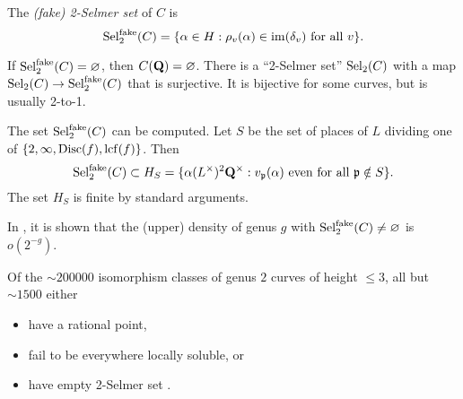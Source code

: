 \begin{defi}
The \emph{(fake) 2-Selmer set} of $C$ is 
\[
  \operatorname{Sel}_2^\mathrm{fake}(C) = \{\alpha\in H:\rho_v(\alpha)\in \operatorname{im}(\delta_v)\text{ for all }v\} .
\]
\end{defi}

If $\operatorname{Sel}_2^\mathrm{fake}(C)=\varnothing$, then $C(\mathbf{Q})=\varnothing$. 
There is a ``2-Selmer set'' $\operatorname{Sel}_2(C)$ with a map 
$\operatorname{Sel}_2(C) \to \operatorname{Sel}_2^\mathrm{fake}(C)$ that is surjective. It is 
bijective for some curves, but is usually 2-to-1. 

The set $\operatorname{Sel}_2^\mathrm{fake}(C)$ can be computed. Let $S$ be the set of 
places of $L$ dividing one of 
$\{2,\infty,\operatorname{Disc}(f),\operatorname{lcf}(f)\}$. Then 
\[
  \operatorname{Sel}_2^\mathrm{fake}(C)\subset H_S = \{\alpha (L^\times)^2\mathbf{Q}^\times:v_{\mathfrak{p}}(\alpha)\text{ even for all }\mathfrak{p}\notin S\} .
\]
The set $H_S$ is finite by standard arguments. 

In \cite{bg13}, it is shown that the (upper) density of genus $g$ 
with $\operatorname{Sel}_2^\mathrm{fake}(C)\ne\varnothing$ is $o(2^{-g})$. 

\begin{example}
Of the $\sim 200000$ isomorphism classes of genus $2$ curves of height 
$\leqslant 3$, all but $\sim 1500$ either 
\begin{itemize}
  \item have a rational point, 
  \item fail to be everywhere locally soluble, or 
  \item have empty 2-Selmer set .
\end{itemize}
\end{example}




